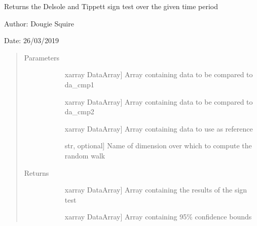 \documentclass[letterpaper,10pt,english]{sphinxmanual}
\begin{document}

\begin{fulllineitems}
\label{\detokenize{skill_doc:skill.sign_test}}
Returns the Delsole and Tippett sign test over the given time period

\begin{DUlineblock}{0em}
\item[] Author: Dougie Squire
\item[] Date: 26/03/2019
\end{DUlineblock}
\begin{quote}\begin{description}
\item[{Parameters}] \leavevmode\begin{description}
\item[{}] \leavevmode{[}xarray DataArray{]}
Array containing data to be compared to da\_cmp1

\item[{}] \leavevmode{[}xarray DataArray{]}
Array containing data to be compared to da\_cmp2

\item[{}] \leavevmode{[}xarray DataArray{]}
Array containing data to use as reference

\item[{}] \leavevmode{[}str, optional{]}
Name of dimension over which to compute the random walk

\end{description}

\item[{Returns}] \leavevmode\begin{description}
\item[{}] \leavevmode{[}xarray DataArray{]}
Array containing the results of the sign test

\item[{}] \leavevmode{[}xarray DataArray{]}
Array containing 95\% confidence bounds

\end{description}

\end{description}\end{quote}

\end{fulllineitems}
\end{document}
